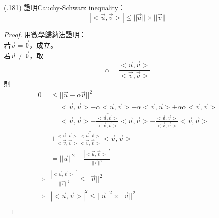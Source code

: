 \item \begin{theorem}{(.181)} 證明Cauchy-Schwarz inequality：\begin{equation}
		|<\vec{u}, \vec{v}>| \le ||\vec{u}|| \times ||\vec{v}||
	\end{equation} \begin{proof}
		用數學歸納法證明： \\
		若$\vec{v} = \vec{0}$，成立。 \\
		若$\vec{v} \neq \vec{0}$，取\begin{equation}
			\alpha = \frac{<\vec{u}, \vec{v}>}{<\vec{v}, \vec{v}>}
		\end{equation} 則 \begin{equation}
			\begin{aligned}
				0 & \le ||\vec{u} - \alpha\vec{v}||^2 \\
				& = <\vec{u}, \vec{u}> - \overline{\alpha}<\vec{u}, \vec{v}> - \alpha<\vec{v}, \vec{u}> + \alpha\overline{\alpha}<\vec{v}, \vec{v}> \\
				& = <\vec{u}, \vec{u}> - \overline{\frac{<\vec{u}, \vec{v}>}{<\vec{v}, \vec{v}>}}<\vec{u}, \vec{v}> - \frac{<\vec{u}, \vec{v}>}{<\vec{v}, \vec{v}>}<\vec{v}, \vec{u}> \\
				& + \frac{<\vec{u}, \vec{v}>}{<\vec{v}, \vec{v}>}\overline{\frac{<\vec{u}, \vec{v}>}{<\vec{v}, \vec{v}>}}<\vec{v}, \vec{v}> \\
				& = ||\vec{u}||^2 - \frac{|<\vec{u}, \vec{v}>|^2}{||\vec{v}||^2} \\
				\Rightarrow & \frac{|<\vec{u}, \vec{v}>|^2}{||\vec{v}||^2} \le ||\vec{u}||^2 \\
				\Rightarrow & |<\vec{u}, \vec{v}>|^2 \le ||\vec{u}||^2 \times ||\vec{v}||^2 \\
			\end{aligned}
		\end{equation}
	\end{proof}
\end{theorem}